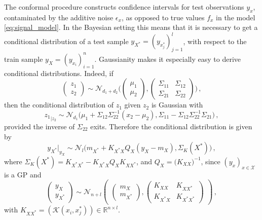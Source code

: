 \documentclass[a4paper,14pt]{extarticle}
\newcommand{\Ncal}{\mathcal{N}}
\newcommand{\Kcal}{\mathcal{K}}
\newcommand{\Xcal}{\mathcal{X}}
\newcommand{\Real}{\mathbb{R}}
\begin{document}
The conformal procedure constructs confidence intervals for test observations $y_x$,
contaminated by the additive noise $\epsilon_x$, as opposed to true values $f_x$ in
the model \ref{eq:signal_model}. In the Bayesian setting this means that it is necessary
to get a conditional distribution of a test sample $y_{X^*} = (y_{x^*_j})_{j=1}^l$,
with respect to the train sample $y_X = (y_{x_i})_{i=1}^n$. Gaussianity makes it
especially easy to derive conditional distributions. Indeed, if
\begin{equation*}
  \begin{pmatrix}z_1 \\ z_2\end{pmatrix}
    \sim \Ncal_{d_1+d_2}\Biggl(
      \begin{pmatrix} \mu_1 \\ \mu_2 \end{pmatrix},
      \begin{pmatrix}
        \Sigma_{11} & \Sigma_{12} \\
        \Sigma_{21} & \Sigma_{22}
      \end{pmatrix}
    \Biggr)
    \,,
\end{equation*}
then the conditional distribution of $z_1$ given $z_2$ is Gaussian with
\begin{equation*}
  {z_1}_{|z_2}
    \sim \Ncal_{d_1}\bigl(
      \mu_1 + \Sigma_{12}\Sigma_{22}^{-1}(x_2-\mu_2),
      \Sigma_{11} - \Sigma_{12}\Sigma_{22}^{-1}\Sigma_{21}
    \bigr)
    \,,
\end{equation*}
provided the inverse of $\Sigma_{22}$ exits. Therefore the conditional distribution
is given by
\begin{equation} \label{eq:cond_distr}
  y_{X^*}\vert_{y_X}
    \sim \Ncal_l\bigl(
      m_{X^*} + K_{X^*X} Q_X (y_X - m_X),
      \Sigma_K(X^*)
    \bigr)
    \,,
\end{equation}
where $\Sigma_K(X^*) = K_{X^*X^*} - K_{X^*X} Q_X K_{XX^*}$, and
$Q_X = \bigl(K_{XX}\bigr)^{-1}$, since $(y_x)_{x\in\Xcal}$ is a GP and
\begin{equation*}
  \begin{pmatrix} y_X \\ y_{X^*} \end{pmatrix}
    \sim \Ncal_{n+l}\begin{pmatrix}
      \begin{pmatrix} m_X \\ m_{X^*} \end{pmatrix},
      \begin{pmatrix}
        K_{XX} & K_{XX^*} \\
        K_{X^*X} & K_{X^*X^*}
      \end{pmatrix}
    \end{pmatrix}
    \,,
\end{equation*}
with $K_{XX^*} = (\Kcal(x_i, x^*_j))\in \Real^{n\times l}$.
\end{document}
